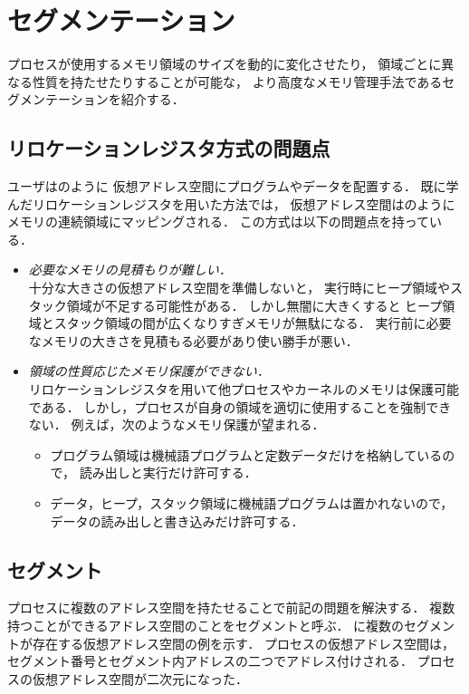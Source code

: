\chapter{セグメンテーション}
\label{chap:segmentation}
プロセスが使用するメモリ領域のサイズを動的に変化させたり，
領域ごとに異なる性質を持たせたりすることが可能な，
より高度なメモリ管理手法であるセグメンテーションを紹介する．

\section{リロケーションレジスタ方式の問題点}
ユーザはのように
仮想アドレス空間にプログラムやデータを配置する．
既に学んだリロケーションレジスタを用いた方法では，
仮想アドレス空間はのように
メモリの連続領域にマッピングされる．
この方式は以下の問題点を持っている．

\begin{itemize}
\item \emph{必要なメモリの見積もりが難しい．} \\
  十分な大きさの仮想アドレス空間を準備しないと，
  実行時にヒープ領域やスタック領域が不足する可能性がある．
  しかし無闇に大きくすると
  ヒープ領域とスタック領域の間が広くなりすぎメモリが無駄になる．
  実行前に必要なメモリの大きさを見積もる必要があり使い勝手が悪い．
\item \emph{領域の性質応じたメモリ保護ができない．} \\
  リロケーションレジスタを用いて他プロセスやカーネルのメモリは保護可能である．
  しかし，プロセスが自身の領域を適切に使用することを強制できない．
  例えば，次のようなメモリ保護が望まれる．
  \begin{itemize}
  \item プログラム領域は機械語プログラムと定数データだけを格納しているので，
    読み出しと実行だけ許可する．
  \item データ，ヒープ，スタック領域に機械語プログラムは置かれないので，
    データの読み出しと書き込みだけ許可する．
  \end{itemize}
\end{itemize}

\section{セグメント}
プロセスに複数のアドレス空間を持たせることで前記の問題を解決する．
複数持つことができるアドレス空間のことをセグメントと呼ぶ．
に複数のセグメントが存在する仮想アドレス空間の例を示す．
プロセスの仮想アドレス空間は，
セグメント番号とセグメント内アドレスの二つでアドレス付けされる．
プロセスの仮想アドレス空間が二次元になった．

